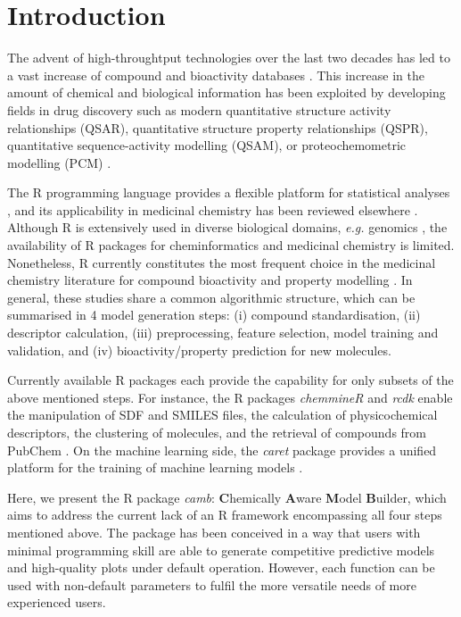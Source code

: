 \documentclass{bioinfo}
\begin{document}
\section{Introduction}

The advent of high-throughtput technologies over the last two decades 
has led to a vast increase of compound and bioactivity databases \citep{bender_databases,chembl,pubchem}.
This increase in the amount of chemical and biological information 
has been exploited by developing fields in drug discovery 
such as modern quantitative structure activity relationships (QSAR), 
quantitative structure property relationships (QSPR), quantitative sequence-activity modelling (QSAM), 
or proteochemometric modelling (PCM) \citep{review_pcm,cortesReview}.

The R programming language provides a flexible platform for statistical analyses \citep{Rlanguage},
and its applicability in medicinal chemistry has been reviewed elsewhere \citep{mente}.
Although R is extensively used in diverse biological domains, {\it e.g.} genomics \citep{bioconductor},
the availability of R packages for cheminformatics and medicinal chemistry is limited. %
Nonetheless, R currently constitutes the most frequent choice in the medicinal chemistry literature
for compound bioactivity and property modelling \citep{mente}.
In general, these studies share a common algorithmic structure, which can be summarised in 4 model generation steps:
(i) compound standardisation, (ii) descriptor calculation,
(iii) preprocessing, feature selection, model training and validation, and (iv) bioactivity/property prediction for new molecules.

Currently available R packages each provide the capability for only subsets of the above mentioned steps.
For instance, the R packages {\it chemmineR} \citep{chemmineR} and {\it rcdk} \citep{rcdk} enable the manipulation of SDF and SMILES
files, the calculation of physicochemical descriptors, the clustering of molecules,
and the retrieval of compounds from PubChem \citep{pubchem}.
On the machine learning side, the {\it caret} package provides a
unified platform for the training of machine learning models \citep{caret}.

Here, we present the R package {\it camb}: {\bf C}hemically {\bf A}ware {\bf M}odel {\bf B}uilder,
which aims to address the current lack of an R framework encompassing all four steps mentioned above.
The package has been conceived in a way that users with minimal
programming skill are able to generate competitive predictive models and high-quality plots
under default operation.
However, each function can be used with non-default parameters to fulfil the more versatile needs of more experienced users.
\end{document}
